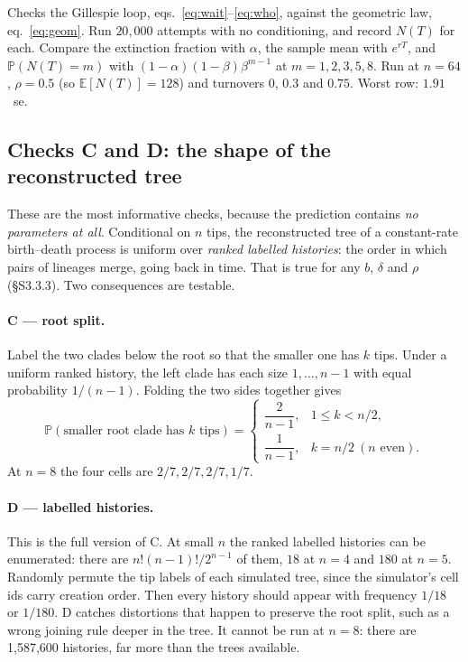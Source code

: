 \documentclass[11pt]{article}
\newcommand{\bdrate}{b}          %
\newcommand{\dthrate}{\delta}    %
\newcommand{\net}{r}             %
\newcommand{\capt}{\rho}         %
\newcommand{\E}{\mathbb{E}}
\newcommand{\Prob}{\mathbb{P}}
\begin{document}
Checks the Gillespie loop, eqs.~\eqref{eq:wait}--\eqref{eq:who}, against the geometric law,
eq.~\eqref{eq:geom}. Run $20{,}000$ attempts with no conditioning, and record $N(T)$ for each.
Compare the extinction fraction with $\alpha$, the sample mean with $e^{\net T}$, and
$\Prob(N(T)=m)$ with $(1-\alpha)(1-\beta)\beta^{m-1}$ at $m=1,2,3,5,8$. Run at $n=64$,
$\capt=0.5$ (so $\E[N(T)]=128$) and turnovers $0$, $0.3$ and $0.75$. Worst row: $1.91$~se.

\subsection{Checks C and D: the shape of the reconstructed tree}\label{sec:shape}

These are the most informative checks, because the prediction contains \emph{no parameters at
all}. Conditional on $n$ tips, the reconstructed tree of a constant-rate birth--death process is
uniform over \emph{ranked labelled histories}: the order in which pairs of lineages merge, going
back in time. That is true for any $\bdrate$, $\dthrate$ and $\capt$ (\S S3.3.3). Two consequences
are testable.

\paragraph{C --- root split.} Label the two clades below the root so that the smaller one has $k$
tips. Under a uniform ranked history, the left clade has each size $1,\dots,n-1$ with equal
probability $1/(n-1)$. Folding the two sides together gives
\begin{equation}
  \Prob(\text{smaller root clade has $k$ tips}) =
  \begin{cases}
    \dfrac{2}{n-1}, & 1 \le k < n/2,\\[6pt]
    \dfrac{1}{n-1}, & k = n/2 \ (\text{$n$ even}).
  \end{cases}
  \label{eq:rootsplit}
\end{equation}
At $n=8$ the four cells are $2/7, 2/7, 2/7, 1/7$.

\paragraph{D --- labelled histories.} This is the full version of C. At small $n$ the ranked
labelled histories can be enumerated: there are $n!(n-1)!/2^{n-1}$ of them, $18$ at $n=4$ and $180$
at $n=5$. Randomly permute the tip labels of each simulated tree, since the simulator's cell ids
carry creation order. Then every history should appear with frequency $1/18$ or $1/180$. D catches
distortions that happen to preserve the root split, such as a wrong joining rule deeper in the
tree. It cannot be run at $n=8$: there are 1,587,600 histories, far more than the trees available.
\end{document}
